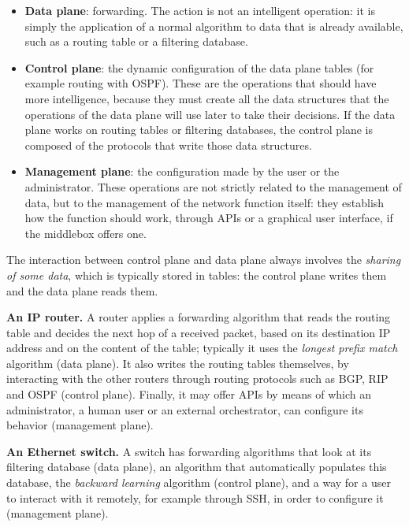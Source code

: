 \begin{itemize}
\item \textbf{Data plane}: forwarding. The action is not an intelligent operation: it is simply the application of a normal algorithm to data that is already available, such as a routing table or a filtering database.
\item \textbf{Control plane}: the dynamic configuration of the data plane tables (for example routing with OSPF). These are the operations that should have more intelligence, because they must create all the data structures that the operations of the data plane will use later to take their decisions. If the data plane works on routing tables or filtering databases, the control plane is composed of the protocols that write those data structures.
\item \textbf{Management plane}: the configuration made by the user or the administrator. These operations are not strictly related to the management of data, but to the management of the network function itself: they establish how the function should work, through APIs or a graphical user interface, if the middlebox offers one.
\end{itemize}

The interaction between control plane and data plane always involves the \emph{sharing of some data}, which is typically stored in tables: the control plane writes them and the data plane reads them.

\begin{notebox}
	\textbf{An IP router.} A router applies a forwarding algorithm that reads the routing table and decides the next hop of a received packet, based on its destination IP address and on the content of the table; typically it uses the \emph{longest prefix match} algorithm (data plane). It also writes the routing tables themselves, by interacting with the other routers through routing protocols such as BGP, RIP and OSPF (control plane). Finally, it may offer APIs by means of which an administrator, a human user or an external orchestrator, can configure its behavior (management plane).

	\medskip
	\textbf{An Ethernet switch.} A switch has forwarding algorithms that look at its filtering database (data plane), an algorithm that automatically populates this database, the \emph{backward learning} algorithm (control plane), and a way for a user to interact with it remotely, for example through SSH, in order to configure it (management plane).
\end{notebox}

